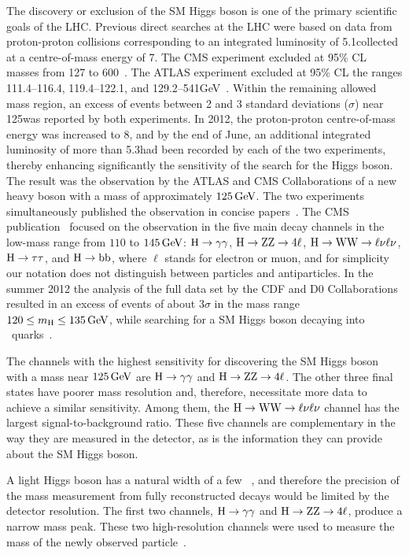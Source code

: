 \documentclass[11pt,twoside,a4paper,cmspaper,final,collab]{cms-tdr}
\begin{document}
The discovery or exclusion of the SM Higgs boson is one of the primary scientific goals of the LHC.
Previous direct searches at the LHC were based on data from proton-proton collisions corresponding to
an integrated luminosity of 5.1\fbinv collected at a centre-of-mass
energy of 7\TeV.
The CMS experiment excluded
at 95\% CL masses from 127 to 600\GeV~\cite{Chatrchyan:2012tx}.
The ATLAS experiment excluded at 95\% CL the ranges 111.4--116.4,
119.4--122.1, and 129.2--541\unit{GeV}~\cite{ATLAScombJul2012_7TeV}.
Within the remaining allowed mass region, an excess of events between
2 and 3 standard deviations ($\sigma$) near
125\GeV was reported by both experiments.
In 2012, the proton-proton centre-of-mass energy was increased to 8\TeV, and by the end of June,
an additional integrated luminosity of more than 5.3\fbinv had been
recorded by each of the two experiments,
thereby enhancing significantly the sensitivity of the search for the Higgs boson.
The result was the observation by the ATLAS and CMS Collaborations of a new heavy boson with a mass of approximately $125\,\text{Ge\hspace{-.08em}V}$.
The two experiments simultaneously published the observation in concise
papers~\cite{ATLASobservation125,CMSobservation125}. The CMS publication~\cite{CMSobservation125} focused
on the observation in the five main decay channels in the low-mass
range from
$110$ to $145\,\text{Ge\hspace{-.08em}V}$: $\mathrm{H} \to \gamma\gamma$, $\mathrm{H} \to \mathrm{Z} \mathrm{Z} \to 4\ell$, $\mathrm{H} \to \mathrm{W}\mathrm{W} \to
\ell\nu\ell\nu$, $\mathrm{H} \to \tau\tau$, and  $\mathrm{H} \to \mathrm{b}\mathrm{b}$, where  $\ell$ stands for electron or muon,
and for simplicity our notation does not distinguish
between particles and antiparticles.
In the summer 2012 the analysis of the full data set by the CDF and D0 Collaborations
resulted in an excess of events of about 3$\sigma$ in the mass
range $120 \le m_{\mathrm{H}} \le 135\,\text{Ge\hspace{-.08em}V}$, while searching for a SM Higgs boson
decaying into \cPqb\ quarks~\cite{PhysRevLett.109.071804}.

The channels with the highest sensitivity for discovering the SM Higgs boson
with a mass near $125\,\text{Ge\hspace{-.08em}V}$ are $\mathrm{H} \to \gamma\gamma$ and $\mathrm{H} \to \mathrm{Z}
\mathrm{Z} \to 4\ell$.
The other three final states have poorer mass resolution and, therefore, necessitate more data
to achieve a similar sensitivity.
Among them, the  $\mathrm{H} \to \mathrm{W}\mathrm{W} \to
\ell\nu\ell\nu$ channel has the largest signal-to-background ratio.
These five channels are complementary in the way they are measured in the detector, as is the
information they can provide about the SM Higgs boson.

A light Higgs boson has a natural width of a few \MeV~\cite{LHCHiggsCrossSectionWorkingGroup:2011ti},
and
therefore the precision of the mass measurement from fully
reconstructed decays would be limited
by the detector resolution.
The first two channels, $\mathrm{H} \to \gamma\gamma$ and $\mathrm{H} \to \mathrm{Z}\mathrm{Z} \to 4\ell$, produce a narrow mass
peak.
These two high-resolution channels were used to measure the mass of
the newly observed particle~\cite{CMSobservation125,ATLASobservation125}.
\end{document}
